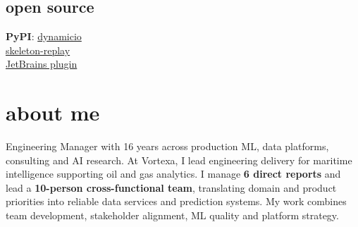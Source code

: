 \documentclass[]{../../../../friggeri-cv}
\begin{document}
\begin{aside}
    \section{open source}
        {\footnotesize \textbf{PyPI}: \href{https://pypi.org/project/dynamicio/}{dynamicio}\\\href{https://pypi.org/project/skeleton-replay/}{skeleton-replay}\\\href{https://plugins.jetbrains.com/plugin/32807-skeleton-replay}{JetBrains plugin}}
\end{aside}

\section{about me}
{\normalsize Engineering Manager with 16 years across production ML, data platforms, consulting and AI research. At Vortexa, I lead engineering delivery for maritime intelligence supporting oil and gas analytics. I manage \textbf{6 direct reports} and lead a \textbf{10-person cross-functional team}, translating domain and product priorities into reliable data services and prediction systems. My work combines team development, stakeholder alignment, ML quality and platform strategy.}
\end{document}
